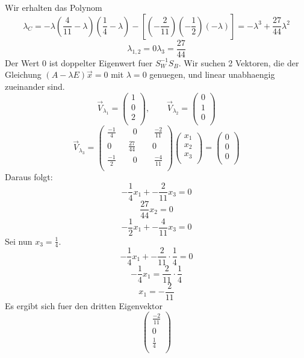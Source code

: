 \documentclass{article}
\begin{document}
Wir erhalten das Polynom
\[
\lambda_C = -\lambda (\frac{4}{11} - \lambda)(\frac{1}{4} - \lambda)
- [ (-\frac{2}{11}) (-\frac{1}{2}) (-\lambda) ] = - \lambda^3 + \frac{27}{44} \lambda^2
\]
\[
\lambda_{1,2} = 0
\lambda_3 = \frac{27}{44}
\]
Der Wert $0$ ist doppelter Eigenwert fuer $S_W^{-1}S_B$. Wir suchen 2 Vektoren,
die der Gleichung $(A - \lambda E) \vec{x} = 0$ mit $\lambda = 0$ genuegen, und linear 
unabhaengig zueinander sind.
\[
\vec{V}_{\lambda_{1}} = 
\left(
\begin {array} {c}
1  \\
0  \\
2  \\
\end {array}
\right)
, \qquad
\vec{V}_{\lambda_{2}} = 
\left(
\begin {array} {c}
0  \\
1  \\
0  \\
\end {array}
\right)
\]
\[
\vec{V}_{\lambda_{3}} =
\left(
\begin {array} {c}
\frac{-1}{4} \qquad 0 \qquad \frac{-2}{11}  \\
0 \qquad \frac{27}{44} \qquad 0  \\
\frac{-1}{2} \qquad 0 \qquad \frac{-4}{11}  \\
\end {array}
\right)
\left(
\begin {array} {c}
x_1  \\
x_2  \\
x_3  \\
\end {array}
\right)
= 
\left(
\begin {array} {c}
0  \\
0  \\
0  \\
\end {array}
\right)
\]
Daraus folgt:
\[
-\frac{1}{4} x_1 + -\frac{2}{11} x_3 = 0 
\]
\[
\frac{27}{44} x_2 = 0
\]
\[
-\frac{1}{2} x_1 + -\frac{4}{11} x_3 = 0
\]
Sei nun $x_3 = \frac{1}{4}$.
\[
-\frac{1}{4} x_1 + -\frac{2}{11} \cdot \frac{1}{4} = 0 
\]
\[
-\frac{1}{4} x_1 = \frac{2}{11} \cdot \frac{1}{4} 
\]
\[
x_1 = -\frac{2}{11} 
\]
Es ergibt sich fuer den dritten Eigenvektor
\[
\left(
\begin {array} {c}
\frac{-2}{11}  \\
0  \\
\frac{1}{4}  \\
\end {array}
\right)
\]
\end{document}

